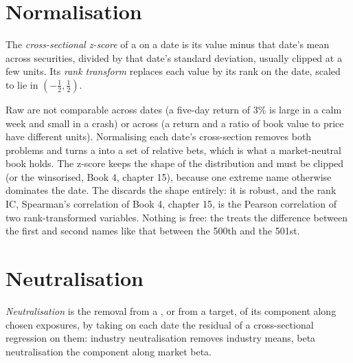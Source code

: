 \section{Normalisation}

\begin{definition}\label{def:rs:anatomy-of-a-predictor:normalise}
The \emph{cross-sectional z-score} of a  on a date is its value minus that date's mean
across securities, divided by that date's standard deviation, usually clipped at a few units. Its \emph{rank
transform} replaces each value by its rank on the date, scaled to lie in $(-\tfrac12, \tfrac12)$.
\end{definition}

Raw  are not comparable across dates (a five-day return of 3\% is large in a calm week and small in a crash) or
across  (a return and a ratio of book value to price have different units). Normalising each date's cross-section
removes both problems and turns a  into a set of relative bets, which is what a market-neutral book holds. The
z-score keeps the shape of the distribution and must be clipped (or the  winsorised, Book 4, chapter 15), because one
extreme name otherwise dominates the date. The  discards the shape entirely: it is robust, and the rank IC,
Spearman's correlation of Book 4, chapter 15, is the Pearson correlation of two rank-transformed variables. Nothing is free:
the  treats the difference between the first and second names like that between the 500th and the 501st.

\section{Neutralisation}

\begin{definition}[Neutralisation]\label{def:rs:anatomy-of-a-predictor:neutralise}
\emph{Neutralisation} is the removal from a , or from a target, of its component along chosen
exposures, by taking on each date the residual of a cross-sectional regression on them: industry neutralisation removes
industry means, beta neutralisation the component along market beta.
\end{definition}


